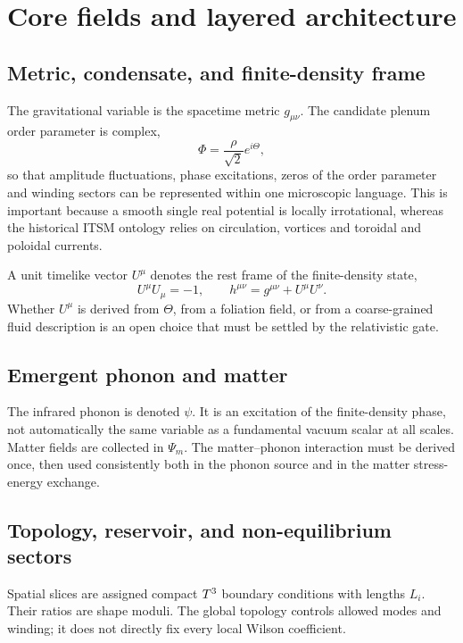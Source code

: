\section{Core fields and layered architecture}

\subsection{Metric, condensate, and finite-density frame}

The gravitational variable is the spacetime metric $g_{\mu\nu}$.  The
candidate plenum order parameter is complex,
\begin{equation}
 \Phi=\frac{\rho}{\sqrt{2}}e^{i\Theta},
 \label{eq:complex-order}
\end{equation}
so that amplitude fluctuations, phase excitations, zeros of the order
parameter and winding sectors can be represented within one microscopic
language.  This is important because a smooth single real potential is locally
irrotational, whereas the historical ITSM ontology relies on circulation,
vortices and toroidal and poloidal currents.

A unit timelike vector $U^\mu$ denotes the rest frame of the finite-density
state,
\begin{equation}
 U^\mu U_\mu=-1,
 \qquad
 h^{\mu\nu}=g^{\mu\nu}+U^\mu U^\nu.
 \label{eq:projector}
\end{equation}
Whether $U^\mu$ is derived from $\Theta$, from a foliation field, or from a
coarse-grained fluid description is an open choice that must be settled by the
relativistic gate.

\subsection{Emergent phonon and matter}

The infrared phonon is denoted $\psi$.  It is an excitation of the
finite-density phase, not automatically the same variable as a fundamental
vacuum scalar at all scales.  Matter fields are collected in $\Psi_m$.  The
matter--phonon interaction must be derived once, then used consistently both
in the phonon source and in the matter stress-energy exchange.

\subsection{Topology, reservoir, and non-equilibrium sectors}

Spatial slices are assigned compact $T^3$ boundary conditions with lengths
$L_i$.  Their ratios are shape moduli.  The global topology controls allowed
modes and winding; it does not directly fix every local Wilson coefficient.

